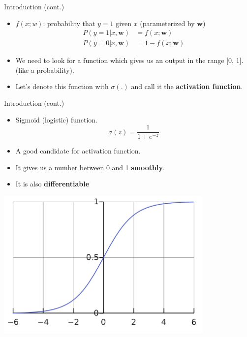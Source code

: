 \documentclass[serif, aspectratio=169]{beamer}
\begin{document}
\begin{frame}{Introduction (cont.)}
    \begin{itemize}
        \item $f(x;w)$: probability that $y=1$ given $x$ (parameterized by \textbf{$\textbf{w}$})
      \begin{align*}
        P(y=1|x,\mathbf{w}) &= f(x;\mathbf{w}) \\
        P(y=0|x,\mathbf{w}) &= 1 - f(x;\mathbf{w})
      \end{align*}

        \item We need to look for a function which gives us an output in the range [0, 1]. (like a probability).

        \item Let's denote this function with $\sigma (.)$ and call it the \textbf{activation function}.
        
    \end{itemize}
\end{frame}

\begin{frame}{Introduction (cont.)}
    \begin{minipage}{0.55\textwidth}
    \begin{itemize}
        \item Sigmoid (logistic) function.
        \[
            \sigma (z) = \frac{1}{1 + e^{-z}}
        \]
        \item A good candidate for activation function.
        
        \item It gives us a number between 0 and 1 \textbf{smoothly}.
        \item It is also \textbf{differentiable}

    \end{itemize}
    \end{minipage}%
    \begin{minipage}{0.4\textwidth}
        \centering
        \includegraphics[width=0.8\textwidth]{pic/sigmoid.png}
    \end{minipage}
\end{frame}
    
\end{document}
